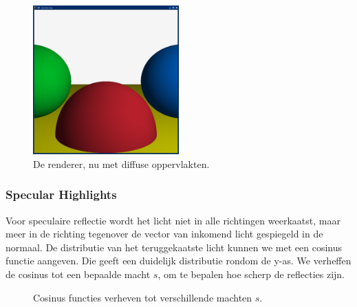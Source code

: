 \documentclass[12pt, a4paper]{article}
\begin{document}
\begin{figure}[h]
    \centering
    \includegraphics[width=0.50\textwidth]{renders/diffused.png}
    \caption{De renderer, nu met diffuse oppervlakten.}
    \label{fig:diffused}
\end{figure}

\subsubsection{Specular Highlights}

Voor speculaire reflectie wordt het licht niet in alle richtingen weerkaatst, maar meer in de richting tegenover de vector van inkomend licht gespiegeld in de normaal. De distributie van het teruggekaatste licht kunnen we met een cosinus functie aangeven. Die geeft een duidelijk distributie rondom de y-as. We verheffen de cosinus tot een bepaalde macht $s$, om te bepalen hoe scherp de reflecties zijn.

\begin{figure}[h]
    \centering
    \caption{Cosinus functies verheven tot verschillende machten $s$.}
    \label{fig:cosini}
\end{figure}
\end{document}
